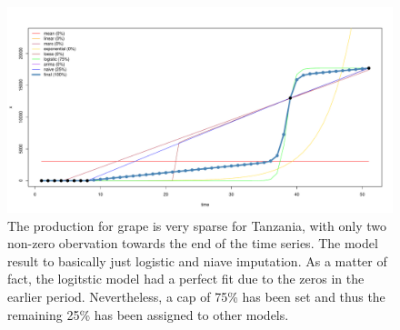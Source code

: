 \documentclass[nojss]{jss}\usepackage[]{graphicx}\usepackage[]{color}
\makeatletter
\def\maxwidth{ %
  \ifdim\Gin@nat@width>\linewidth
    \linewidth
  \else
    \Gin@nat@width
  \fi
}
\newenvironment{knitrout}{}{} %
\makeatother
\begin{document}
\begin{knitrout}
\color{fgcolor}\begin{figure}[!ht]


{\centering \includegraphics[width=\maxwidth]{figure/grape-tanzania} 

}

\caption[The production for grape is very sparse for Tanzania, with only two non-zero obervation towards the end of the time series]{The production for grape is very sparse for Tanzania, with only two non-zero obervation towards the end of the time series. The model result to basically just logistic and niave imputation. As a matter of fact, the logitstic model had a perfect fit due to the zeros in the earlier period. Nevertheless, a cap of 75\% has been set and thus the remaining 25\% has been assigned to other models.\label{fig:grape-tanzania}}
\end{figure}


\end{knitrout}
\end{document}
